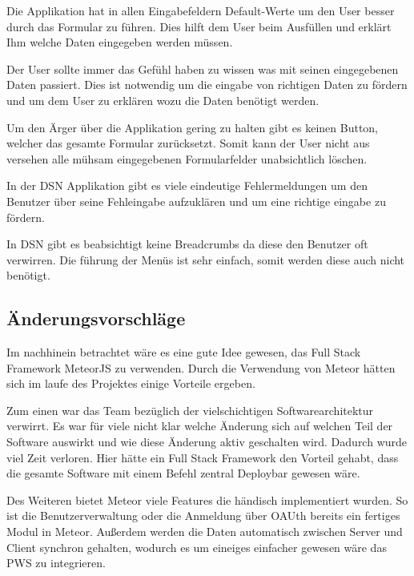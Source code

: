 Die Applikation hat in allen Eingabefeldern Default-Werte um den User besser durch das Formular zu führen. Dies hilft dem User beim Ausfüllen und erklärt Ihm welche Daten eingegeben werden müssen.

Der User sollte immer das Gefühl haben zu wissen was mit seinen eingegebenen Daten passiert. Dies ist notwendig um die eingabe von richtigen Daten zu fördern und um dem User zu erklären wozu die Daten benötigt werden.

Um den Ärger über die Applikation gering zu halten gibt es keinen Button, welcher das gesamte Formular zurücksetzt. Somit kann der User nicht aus versehen alle mühsam eingegebenen Formularfelder unabsichtlich löschen.

In der DSN Applikation gibt es viele eindeutige Fehlermeldungen um den Benutzer über seine Fehleingabe aufzuklären und um eine richtige eingabe zu fördern.

In DSN gibt es beabsichtigt keine Breadcrumbs da diese den Benutzer oft verwirren. Die führung der Menüs ist sehr einfach, somit werden diese auch nicht benötigt.

\subsection{Änderungsvorschläge}
Im nachhinein betrachtet wäre es eine gute Idee gewesen, das Full Stack Framework MeteorJS zu verwenden. Durch die Verwendung von Meteor hätten sich im laufe des Projektes einige Vorteile ergeben. 

Zum einen war das Team bezüglich der vielschichtigen Softwarearchitektur verwirrt. Es war für viele nicht klar welche Änderung sich auf welchen Teil der Software auswirkt und wie diese Änderung aktiv geschalten wird. Dadurch wurde viel Zeit verloren. Hier hätte ein Full Stack Framework den Vorteil gehabt, dass die gesamte Software mit einem Befehl zentral Deploybar gewesen wäre. 

Des Weiteren bietet Meteor viele Features die händisch implementiert wurden. So ist die Benutzerverwaltung oder die Anmeldung über OAUth bereits ein fertiges Modul in Meteor. Außerdem werden die Daten automatisch zwischen Server und Client synchron gehalten, wodurch es um eineiges einfacher gewesen wäre das PWS zu integrieren.